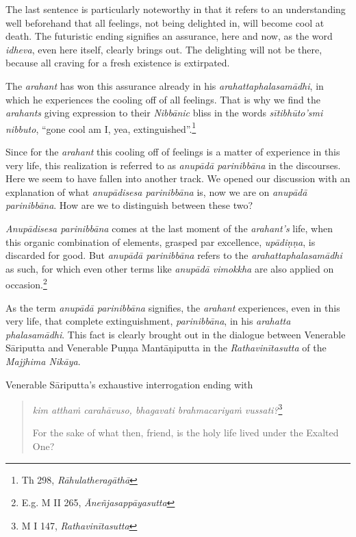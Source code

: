 The last sentence is particularly noteworthy in that it refers to an understanding well beforehand that all feelings, not being delighted in, will become cool at death. The futuristic ending signifies an assurance, here and now, as the word \emph{idheva}, even here itself, clearly brings out. The delighting will not be there, because all craving for a fresh existence is extirpated.

The \emph{arahant} has won this assurance already in his \emph{arahattaphalasamādhi}, in which he experiences the cooling off of all feelings. That is why we find the \emph{arahants} giving expression to their \emph{Nibbānic} bliss in the words \emph{sītibhūto'smi nibbuto}, ``gone cool am I, yea, extinguished''.\footnote{Th 298, \emph{Rāhulatheragāthā}}

Since for the \emph{arahant} this cooling off of feelings is a matter of experience in this very life, this realization is referred to as \emph{anupādā parinibbāna} in the discourses. Here we seem to have fallen into another track. We opened our discussion with an explanation of what \emph{anupādisesa parinibbāna} is, now we are on \emph{anupādā parinibbāna}. How are we to distinguish between these two?

\emph{Anupādisesa parinibbāna} comes at the last moment of the \emph{arahant's} life, when this organic combination of elements, grasped par excellence, \emph{upādiṇṇa}, is discarded for good. But \emph{anupādā parinibbāna} refers to the \emph{arahattaphalasamādhi} as such, for which even other terms like \emph{anupādā vimokkha} are also applied on occasion.\footnote{E.g. M II 265, \emph{Āneñjasappāyasutta}}

As the term \emph{anupādā parinibbāna} signifies, the \emph{arahant} experiences, even in this very life, that complete extinguishment, \emph{parinibbāna}, in his \emph{arahatta phalasamādhi}. This fact is clearly brought out in the dialogue between Venerable Sāriputta and Venerable Puṇṇa Mantāṇiputta in the \emph{Rathavinītasutta} of the \emph{Majjhima Nikāya}.

Venerable Sāriputta's exhaustive interrogation ending with

\begin{quote}
\emph{kim atthaṁ carahāvuso, bhagavati brahmacariyaṁ vussati?}\footnote{M I 147, \emph{Rathavinītasutta}}

For the sake of what then, friend, is the holy life lived under the Exalted One?
\end{quote}

